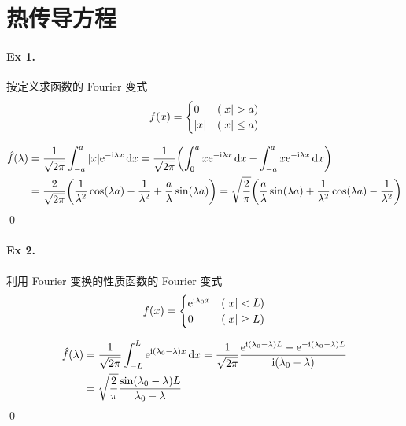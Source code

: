 \section{热传导方程}
\paragraph{Ex 1.}
按定义求函数的 Fourier 变式
\[
f(x) = \begin{cases}0 & ({\lvert {x} \rvert} > a) \\ {\lvert {x} \rvert} & ({\lvert {x} \rvert} \leq a) \end{cases}
\]

\begin{solution}
\begin{align*}
\hat f(\lambda) &= \frac1{\sqrt{2\pi}} \int_{-a}^a
 {\lvert {x} \rvert} {\mathrm e}^{-{\mathrm i} \lambda x} \operatorname{d\!} x
= \frac1{\sqrt{2\pi}} \biggl( \int_0^a x {\mathrm e}^{-{\mathrm i} \lambda x} \operatorname{d\!} x
    -\int_{-a}^a x {\mathrm e}^{-{\mathrm i} \lambda x} \operatorname{d\!} x \biggr) \\
&= \frac{2}{\sqrt{2\pi}} \biggl( \frac1{\lambda^2} \cos (\lambda a)
    - \frac1{\lambda^2} +\frac{a}{\lambda} \sin (\lambda a) \biggr)
= \sqrt{\frac{2}{\pi}} \biggl( \frac{a}{\lambda} \sin (\lambda a)
    + \frac1{\lambda^2} \cos (\lambda a) - \frac1{\lambda^2} \biggr)
\end{align*}
\qed
\end{solution}
\paragraph{Ex 2.}
利用 Fourier 变换的性质函数的 Fourier 变式
\[
f(x)=\begin{cases}{\mathrm e}^{{\mathrm i} \lambda_0 x}&({\lvert {x} \rvert}< L)\\0&({\lvert {x} \rvert}\geq L)\end{cases}
\]

\begin{solution}
\begin{align*}
\hat f(\lambda) &= \frac1{\sqrt{2\pi}} \int_{-L}^L
    {\mathrm e}^{{\mathrm i} (\lambda_0 - \lambda) x} \operatorname{d\!} x
= \frac1{\sqrt{2\pi}} \frac{{\mathrm e}^{{\mathrm i} (\lambda_0 - \lambda) L} 
    - {\mathrm e}^{-{\mathrm i} (\lambda_0 - \lambda) L}}{{\mathrm i} (\lambda_0 - \lambda)} \\
&= \sqrt{\frac{2}{\pi}} \frac{\sin(\lambda_0 - \lambda) L}{\lambda_0 - \lambda}
\end{align*}
\qed
\end{solution}

